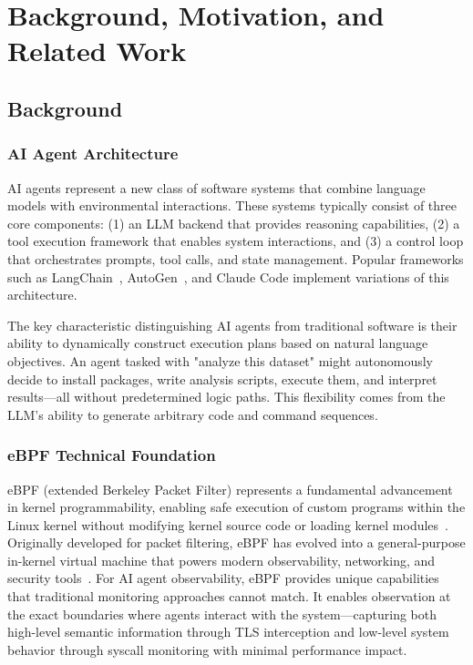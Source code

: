 \section{Background, Motivation, and Related Work}

\subsection{Background}

\subsubsection{AI Agent Architecture}

AI agents represent a new class of software systems that combine language models with environmental interactions. These systems typically consist of three core components: (1) an LLM backend that provides reasoning capabilities, (2) a tool execution framework that enables system interactions, and (3) a control loop that orchestrates prompts, tool calls, and state management. Popular frameworks such as LangChain~\cite{langchain}, AutoGen~\cite{autogen}, and Claude Code implement variations of this architecture.

The key characteristic distinguishing AI agents from traditional software is their ability to dynamically construct execution plans based on natural language objectives. An agent tasked with "analyze this dataset" might autonomously decide to install packages, write analysis scripts, execute them, and interpret results—all without predetermined logic paths. This flexibility comes from the LLM's ability to generate arbitrary code and command sequences.

\subsubsection{eBPF Technical Foundation}

eBPF (extended Berkeley Packet Filter) represents a fundamental advancement in kernel programmability, enabling safe execution of custom programs within the Linux kernel without modifying kernel source code or loading kernel modules~\cite{brendangregg}. Originally developed for packet filtering, eBPF has evolved into a general-purpose in-kernel virtual machine that powers modern observability, networking, and security tools~\cite{ebpfio,cilium}. For AI agent observability, eBPF provides unique capabilities that traditional monitoring approaches cannot match. It enables observation at the exact boundaries where agents interact with the system—capturing both high-level semantic information through TLS interception and low-level system behavior through syscall monitoring with minimal performance impact.


